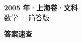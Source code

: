 \documentclass[zihao=-4, a4paper]{ctexart}
\begin{document}
\begin{center}
  {\Large\bfseries 2005 年·上海卷·文科}\\[4pt]
  {\large 数学 · 简答版}
\end{center}
\medskip
{}

\clearpage
{}
\begin{center}{\Large\bfseries 答案速查}\end{center}
\medskip

\end{document}

